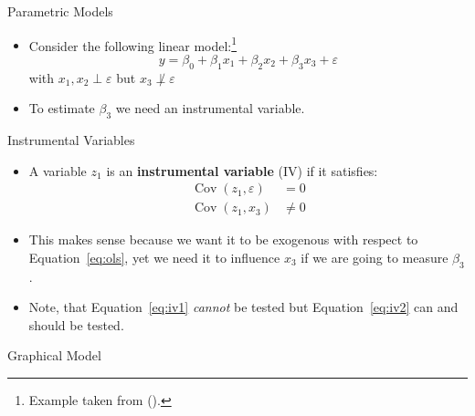 \documentclass[handout]{beamer} %
\DeclareMathOperator*{\Cov}{Cov}
\begin{document}
\begin{frame}{Parametric Models}

\begin{itemize}
  \item Consider the following linear model:\footnote{Example taken from
    (\cite{wooldridge2010econometric}).}
      \[y = \beta_0 + \beta_1 x_1 + \beta_2 x_2 + \beta_3 x_3 + \varepsilon\]
      with $x_1, x_2 \perp \varepsilon$ but $x_3 \not\perp \varepsilon$
    \item To estimate $\beta_3$ we need an instrumental variable.
\end{itemize}

\end{frame}

\begin{frame}{Instrumental Variables}

\begin{itemize}
  \item A variable $z_1$ is an \textbf{instrumental variable} (IV) if it
    satisfies:
    \begin{align}
      \Cov(z_1, \varepsilon) &= 0 \label{eq:iv1}\\
      \Cov(z_1, x_3) &\neq 0 \label{eq:iv2}
    \end{align}
  \item This makes sense because we want it to be exogenous with respect to
    Equation~\ref{eq:ols}, yet we need it to influence $x_3$ if we are going to
    measure $\beta_3$.
  \item Note, that Equation~\ref{eq:iv1} \textit{cannot} be tested but
    Equation~\ref{eq:iv2} can and should be tested.
\end{itemize}

\end{frame}

\begin{frame}{Graphical Model}

  \begin{center}
  \end{center}

\end{frame}
\end{document}
